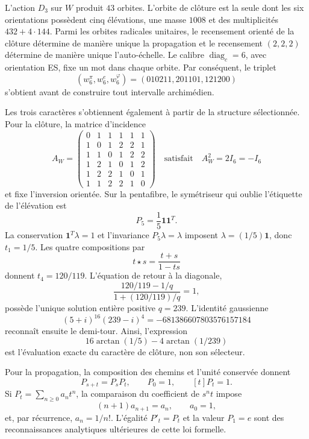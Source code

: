 L'action \(D_3\) sur \(W\) produit \(43\) orbites. L'orbite de clôture
est la seule dont les six orientations possèdent cinq élévations, une masse \(1008\)
et des multiplicités \(432+4\cdot144\). Parmi les orbites radicales unitaires,
le recensement orienté de la clôture détermine de manière unique la propagation et le
recensement \((2,2,2)\) détermine de manière unique l'auto-échelle. Le calibre
\(\operatorname{diag}_c=6\), avec orientation ES, fixe un mot dans chaque
orbite. Par conséquent, le triplet
\[
 (w_6^\pi,w_6^e,w_6^\varphi)
 =(010211,201101,121200)
\]
s'obtient avant de construire tout intervalle archimédien.

Les trois caractères s'obtiennent également à partir de la structure sélectionnée. Pour
la clôture, la matrice d'incidence
\[
 A_W=\begin{pmatrix}
 0&1&1&1&1&1\\
 1&0&1&2&2&1\\
 1&1&0&1&2&2\\
 1&2&1&0&1&2\\
 1&2&2&1&0&1\\
 1&1&2&2&1&0
 \end{pmatrix}
 \quad\text{satisfait}\quad A_W^2=2I_6=-I_6
\]
et fixe l'inversion orientée. Sur la pentafibre, le symétriseur qui
oublie l'étiquette de l'élévation est
\[
 P_5=\frac15\mathbf1\mathbf1^T.
\]
La conservation \(\mathbf1^T\lambda=1\) et l'invariance
\(P_5\lambda=\lambda\) imposent \(\lambda=(1/5)\mathbf1\), donc
\(t_1=1/5\). Les quatre
compositions par
\[
 t\star s=\frac{t+s}{1-ts}
\]
donnent \(t_4=120/119\). L'équation de retour à la diagonale,
\[
 \frac{120/119-1/q}{1+(120/119)/q}=1,
\]
possède l'unique solution entière positive \(q=239\). L'identité gaussienne
\begin{equation}
 \label{eq:generacion-monodromica-identidad-gaussiana-rev7}
 (5+i)^{16}(239-i)^4=-681386607803576157184
\end{equation}
reconnaît ensuite le demi-tour. Ainsi, l'expression
\[
 16\arctan(1/5)-4\arctan(1/239)
\]
est l'évaluation exacte du caractère de clôture, non son sélecteur.

Pour la propagation, la composition des chemins et l'unité conservée donnent
\[
 P_{s+t}=P_sP_t,\qquad P_0=1,\qquad [t]P_t=1.
\]
Si \(P_t=\sum_{n\geq0}a_nt^n\), la comparaison du coefficient de \(s^nt\)
impose
\[
 (n+1)a_{n+1}=a_n,\qquad a_0=1,
\]
et, par récurrence, \(a_n=1/n!\). L'égalité \(P'_t=P_t\) et la valeur
\(P_1=e\) sont des reconnaissances analytiques ultérieures de cette loi formelle.

